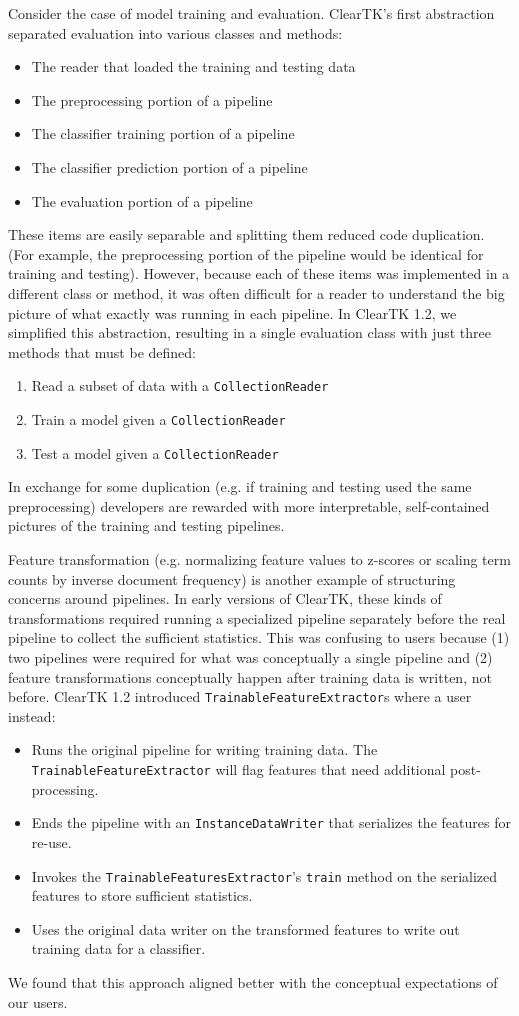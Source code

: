 \documentclass[10pt, a4paper]{article}
\newcommand{\code}[1]{\texttt{\small #1}}
\begin{document}
Consider the case of model training and evaluation.
ClearTK's first abstraction separated evaluation into various classes and methods:
\begin{itemize}
\item The reader that loaded the training and testing data
\item The preprocessing portion of a pipeline
\item The classifier training portion of a pipeline
\item The classifier prediction portion of a pipeline
\item The evaluation portion of a pipeline
\end{itemize}
These items are easily separable and splitting them reduced code duplication. (For example, the preprocessing portion of the pipeline would be identical for training and testing).
However, because each of these items was implemented in a different class or method, it was often difficult for a reader to understand the big picture of what exactly was running in each pipeline.
In ClearTK 1.2, we simplified this abstraction, resulting in a single evaluation class with just three methods that must be defined:
\begin{enumerate}
\item Read a subset of data with a \code{CollectionReader}
\item Train a model given a \code{CollectionReader}
\item Test a model given a \code{CollectionReader}
\end{enumerate}
In exchange for some duplication (e.g. if training and testing used the same preprocessing) developers are rewarded with more interpretable, self-contained pictures of the training and testing pipelines.

Feature transformation (e.g. normalizing feature values to z-scores or scaling term counts by inverse document frequency) is another example of structuring concerns around pipelines.
In early versions of ClearTK, these kinds of transformations required running a specialized pipeline separately before the real pipeline to collect the sufficient statistics.
This was confusing to users because (1) two pipelines were required for what was conceptually a single pipeline and (2) feature transformations conceptually happen after training data is written, not before.
ClearTK 1.2 introduced \code{TrainableFeatureExtractor}s where a user instead:
\begin{itemize}
\item Runs the original pipeline for writing training data. The \code{TrainableFeatureExtractor} will flag features that need additional post-processing.
\item Ends the pipeline with an \code{InstanceDataWriter} that serializes the features for re-use.
\item Invokes the \code{TrainableFeaturesExtractor}'s \code{train} method on the serialized features to store sufficient statistics.
\item Uses the original data writer on the transformed features to write out training data for a classifier.
\end{itemize}
We found that this approach aligned better with the conceptual expectations of our users.
\end{document}
